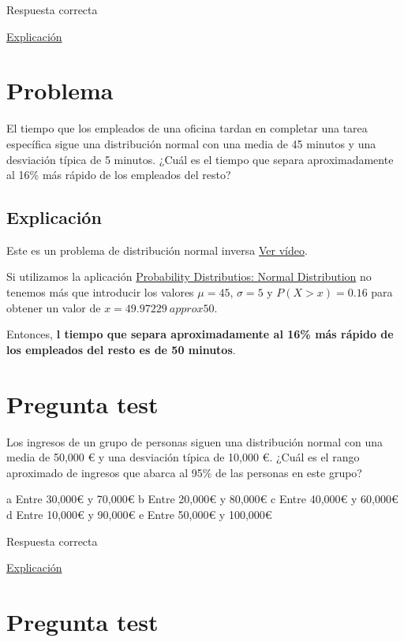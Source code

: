 \documentclass[
]{book}
\begin{document}
Respuesta correcta

\href{https://1fjmanzano.github.io/bioestadistica/distribuciones-de-probabilidad.html\#distribucio\%CC\%81n-normal}{Explicación}

\hypertarget{problema-8}{%
\section{Problema}\label{problema-8}}

El tiempo que los empleados de una oficina tardan en completar una tarea específica sigue una distribución normal con una media de 45 minutos y una desviación típica de 5 minutos. ¿Cuál es el tiempo que separa aproximadamente al 16\% más rápido de los empleados del resto?

\hypertarget{explicaciuxf3n}{%
\subsection{Explicación}\label{explicaciuxf3n}}

Este es un problema de distribución normal inversa \href{https://youtu.be/BqGHUqC4cdQ}{Ver vídeo}.

Si utilizamos la aplicación \href{https://homepage.divms.uiowa.edu/~mbognar/applets/normal.html}{Probability Distributios: Normal Distribution} no tenemos más que introducir los valores \(\mu = 45\), \(\sigma = 5\) y \(P(X > x)= 0.16\) para obtener un valor de \(x = 49.97229 \ approx 50\).

Entonces, \textbf{l tiempo que separa aproximadamente al 16\% más rápido de los empleados del resto es de 50 minutos}.

\hypertarget{pregunta-test-102}{%
\section{Pregunta test}\label{pregunta-test-102}}

Los ingresos de un grupo de personas siguen una distribución normal con una media de 50,000 € y una desviación típica de 10,000 €. ¿Cuál es el rango aproximado de ingresos que abarca al 95\% de las personas en este grupo?

a Entre 30,000€ y 70,000€
b Entre 20,000€ y 80,000€
c Entre 40,000€ y 60,000€
d Entre 10,000€ y 90,000€
e Entre 50,000€ y 100,000€

Respuesta correcta

\href{https://youtu.be/TjZvZVxItLc}{Explicación}

\hypertarget{pregunta-test-103}{%
\section{Pregunta test}\label{pregunta-test-103}}
\end{document}
